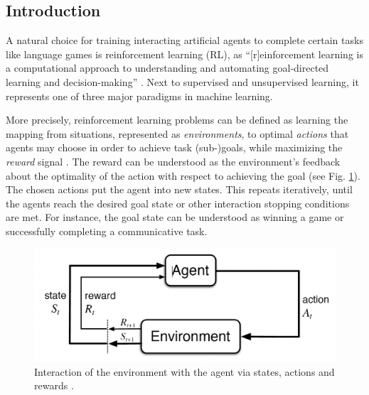 \subsection{Introduction}
A natural choice for training interacting artificial agents to complete certain tasks like language games is reinforcement learning (RL), as ``[r]einforcement learning is a computational approach to understanding and automating goal-directed learning and decision-making'' \parencite[][p.15]{sutton2018reinforcement}. Next to supervised and unsupervised learning, it represents one of three major paradigms in machine learning. 

More precisely, reinforcement learning problems can be defined as learning the mapping from situations, represented as \textit{environments}, to optimal \textit{actions} that agents may choose in order to achieve task (sub-)goals, while maximizing the \textit{reward} signal \parencite{sutton2018reinforcement}. The reward can be understood as the environment's feedback about the optimality of the action with respect to achieving the goal (see Fig. \ref{fig:rl}). The chosen actions put the agent into new states. This repeats iteratively, until the agents reach the desired goal state or other interaction stopping conditions are met. For instance, the goal state can be understood as winning a game or successfully completing a communicative task. 

\begin{figure}
	\centering
	\includegraphics[width=0.8\linewidth]{images/rl_intro.png}
	\caption{Interaction of the environment with the agent via states, actions and rewards \parencite[][p. 48]{sutton2018reinforcement}.}
	\label{fig:rl}
\end{figure}

